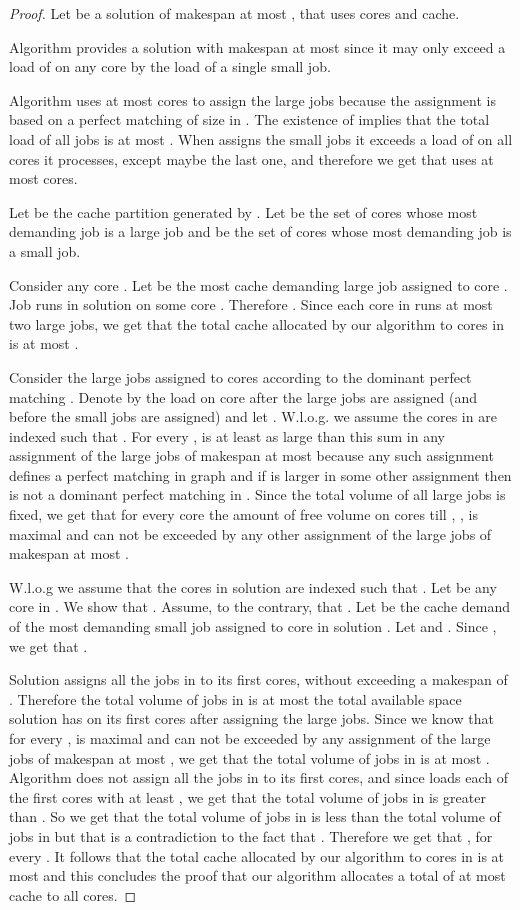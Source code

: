 \documentclass[11pt]{article}
\begin{document}
\begin{proof}
Let  be a solution of makespan at most , that uses  cores and  cache.

Algorithm   provides a solution with makespan at most  since it may only exceed a load of  on any core by the load of a single small job.

Algorithm   uses at most  cores to assign the large jobs because the assignment is based on a perfect matching of size  in .
 The existence of  implies that the total load of all jobs is at most . When  assigns the small jobs it exceeds a load of  on all cores it processes, except maybe the last one, and therefore we get that  uses at most  cores.

Let  be the cache partition generated by  . Let  be the set of cores whose most demanding job is a large job and  be the set of cores whose most demanding job is a small job.

Consider any core . Let  be the most cache demanding large job assigned to core . Job  runs in solution  on some core . Therefore . Since each core in  runs at most two large jobs, we get that the total cache allocated by our algorithm to cores in  is at most .


Consider the large jobs assigned to cores according to the dominant perfect matching . Denote by  the load on core  after the large jobs are assigned (and before the small jobs are assigned) and let .
W.l.o.g. we assume the cores in  are indexed such that .
For every ,  is at least as large than this sum in any assignment of the large jobs of makespan at most  because any such assignment defines a perfect matching in graph  and if  is larger in some other assignment then  is not a dominant perfect matching in .
Since the total volume of all large jobs is fixed, we get that for every core  the amount of free volume on cores  till , , is maximal and can not be exceeded by any other assignment of the large jobs of makespan at most .

W.l.o.g we assume that the cores in solution  are indexed such that .
Let  be any core in . We show that . Assume, to the contrary, that .
Let  be the cache demand of the most demanding small job assigned to core  in solution .
Let  and . Since  , we get that .

Solution  assigns all the jobs in  to its first  cores, without exceeding a makespan of . Therefore the total volume of jobs in  is at most the total available space solution  has on its first  cores after assigning the large jobs. Since we know that for every ,  is maximal and can not be exceeded by any assignment of the large jobs of makespan at most , we get that the total volume of jobs in  is at most  . Algorithm  does not assign all the jobs in  to its first  cores, and since  loads each of the first  cores with at least , we get that the total volume of jobs in  is greater than . So we get that the total volume of jobs in  is less than the total volume of jobs in  but that is a contradiction to the fact that . Therefore we get that , for every .  It follows that the total cache allocated by our algorithm to cores in  is at most  and this concludes the proof that our algorithm allocates a total of at most  cache to all cores.
\end{proof}
\end{document}
